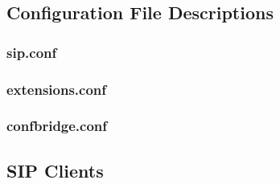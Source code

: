 \documentclass[a4paper,11pt]{report}
\begin{document}
\newpage
\subsection{Configuration File Descriptions}

\subsubsection{sip.conf}
\lstset{escapechar=@,style=customc}


\subsubsection{extensions.conf}


\subsubsection{confbridge.conf}


\newpage
\subsection{SIP Clients}
\end{document}
